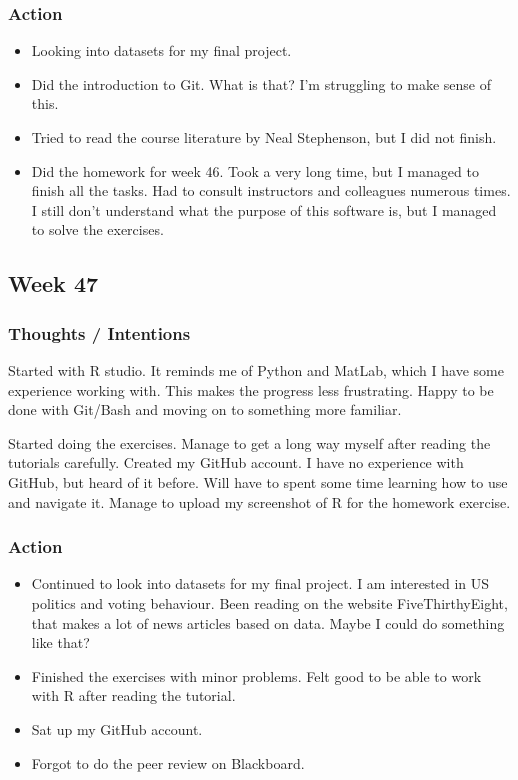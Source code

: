 \documentclass{article}
\begin{document}
\subsubsection{Action}

\begin{itemize}
\item Looking into datasets for my final project.  
\item Did the introduction to Git. What is that? I'm struggling to make sense of this.
\item Tried to read the course literature by Neal Stephenson, but I did not finish.
\item Did the homework for week 46. Took a very long time, but I managed to finish all the tasks. Had to consult instructors and colleagues numerous times. I still don't understand what the purpose of this software is, but I managed to solve the exercises.   
\end{itemize}

\pagebreak{}

\subsection{Week 47}
\subsubsection{Thoughts / Intentions}
Started with R studio. It reminds me of Python and MatLab, which I have some experience working with. This makes the progress less frustrating. Happy to be done with Git/Bash and moving on to something more familiar. 

Started doing the exercises. Manage to get a long way myself after reading the tutorials carefully.
Created my GitHub account. I have no experience with GitHub, but heard of it before. Will have to spent some time learning how to use and navigate it. Manage to upload my screenshot of R for the homework exercise.

\subsubsection{Action}

\begin{itemize}
\item Continued to look into datasets for my final project. I am interested in US politics and voting behaviour. Been reading on the website FiveThirthyEight, that makes a lot of news articles based on data. Maybe I could do something like that? 
\item Finished the exercises with minor problems. Felt good to be able to work with R after reading the tutorial.
\item Sat up my GitHub account. 
\item Forgot to do the peer review on Blackboard.  
\end{itemize}
\end{document}

